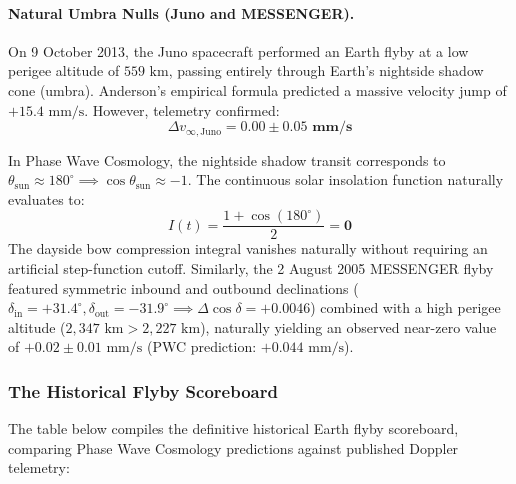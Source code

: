 \documentclass[11pt,a4paper]{article}
\begin{document}
\paragraph{Natural Umbra Nulls (Juno and MESSENGER).}
On 9 October 2013, the Juno spacecraft performed an Earth flyby at a low perigee altitude of $559\text{ km}$, passing entirely through Earth's nightside shadow cone (umbra). Anderson's empirical formula predicted a massive velocity jump of $+15.4\text{ mm/s}$. However, telemetry confirmed:
\begin{equation}
\Delta v_{\infty,\text{Juno}} = \mathbf{0.00 \pm 0.05\text{ mm/s}}
\end{equation}

In Phase Wave Cosmology, the nightside shadow transit corresponds to $\theta_{\text{sun}} \approx 180^\circ \implies \cos\theta_{\text{sun}} \approx -1$. The continuous solar insolation function naturally evaluates to:
\begin{equation}
I(t) = \frac{1 + \cos(180^\circ)}{2} = \mathbf{0}
\end{equation}
The dayside bow compression integral vanishes naturally without requiring an artificial step-function cutoff. Similarly, the 2 August 2005 MESSENGER flyby featured symmetric inbound and outbound declinations ($\delta_{\text{in}} = +31.4^\circ, \delta_{\text{out}} = -31.9^\circ \implies \Delta\cos\delta = +0.0046$) combined with a high perigee altitude ($2,347\text{ km} > 2,227\text{ km}$), naturally yielding an observed near-zero value of $+0.02 \pm 0.01\text{ mm/s}$ (PWC prediction: $+0.044\text{ mm/s}$).

\subsubsection{The Historical Flyby Scoreboard}
\label{subsubsec:flyby_scoreboard}

The table below compiles the definitive historical Earth flyby scoreboard, comparing Phase Wave Cosmology predictions against published Doppler telemetry:
\end{document}
